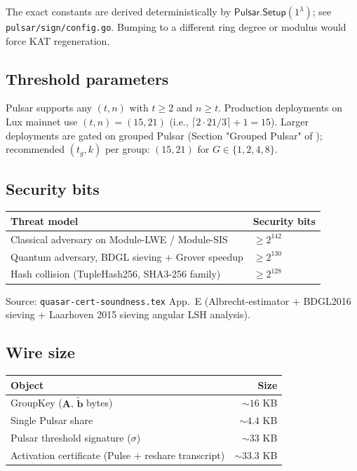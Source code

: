 \documentclass[11pt,a4paper]{article}
\begin{document}
The exact constants are derived deterministically by $\mathsf{Pulsar.Setup}(1^\lambda)$; see \texttt{pulsar/sign/config.go}. Bumping to a different ring degree or modulus would force KAT regeneration.

\subsection{Threshold parameters}

Pulsar supports any $(t, n)$ with $t \geq 2$ and $n \geq t$. Production deployments on Lux mainnet use $(t, n) = (15, 21)$ (i.e., $\lceil 2 \cdot 21 / 3 \rceil + 1 = 15$). Larger deployments are gated on grouped Pulsar (Section "Grouped Pulsar" of \cite{luxquasarhorizon}); recommended $(t_g, k)$ per group: $(15, 21)$ for $G \in \{1, 2, 4, 8\}$.

\subsection{Security bits}

\begin{tabular}{@{}p{}p{}@{}}
  \toprule
  \textbf{Threat model} & \textbf{Security bits} \\
  \midrule
  Classical adversary on Module-LWE / Module-SIS & $\geq 2^{142}$ \\
  Quantum adversary, BDGL sieving + Grover speedup & $\geq 2^{130}$ \\
  Hash collision (TupleHash256, SHA3-256 family) & $\geq 2^{128}$ \\
  \bottomrule
\end{tabular}

Source: \texttt{quasar-cert-soundness.tex} App.~E (Albrecht-estimator + BDGL2016 sieving + Laarhoven 2015 sieving angular LSH analysis).

\subsection{Wire size}

\begin{tabular}{@{}lr@{}}
  \toprule
  \textbf{Object} & \textbf{Size} \\
  \midrule
  GroupKey ($\mathbf{A}$, $\tilde{\mathbf{b}}$ bytes) & $\sim 16$ KB \\
  Single Pulsar share & $\sim 4.4$ KB \\
  Pulsar threshold signature ($\sigma$) & $\sim 33$ KB \\
  Activation certificate (Pulse + reshare transcript) & $\sim 33.3$ KB \\
  \bottomrule
\end{tabular}
\end{document}
